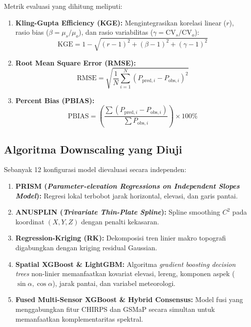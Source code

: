 \documentclass[11pt,a4paper,titlepage]{article}
\begin{document}
Metrik evaluasi yang dihitung meliputi:
\begin{enumerate}
    \item \textbf{Kling-Gupta Efficiency (KGE):} Mengintegrasikan korelasi linear ($r$), rasio bias ($\beta = \mu_s / \mu_o$), dan rasio variabilitas ($\gamma = \text{CV}_s / \text{CV}_o$):
    \begin{equation}
        \text{KGE} = 1 - \sqrt{(r - 1)^2 + (\beta - 1)^2 + (\gamma - 1)^2}
    \end{equation}
    \item \textbf{Root Mean Square Error (RMSE):}
    \begin{equation}
        \text{RMSE} = \sqrt{\frac{1}{N} \sum_{i=1}^{N} (P_{\text{pred}, i} - P_{\text{obs}, i})^2}
    \end{equation}
    \item \textbf{Percent Bias (PBIAS):}
    \begin{equation}
        \text{PBIAS} = \left( \frac{\sum (P_{\text{pred}, i} - P_{\text{obs}, i})}{\sum P_{\text{obs}, i}} \right) \times 100\%
    \end{equation}
\end{enumerate}

\subsection{Algoritma Downscaling yang Diuji}
Sebanyak 12 konfigurasi model dievaluasi secara independen:
\begin{enumerate}
    \item \textbf{PRISM (\textit{Parameter-elevation Regressions on Independent Slopes Model}):} Regresi lokal terbobot jarak horizontal, elevasi, dan garis pantai.
    \item \textbf{ANUSPLIN (\textit{Trivariate Thin-Plate Spline}):} Spline smoothing $C^2$ pada koordinat $(X, Y, Z)$ dengan penalti kekasaran.
    \item \textbf{Regression-Kriging (RK):} Dekomposisi tren linier makro topografi digabungkan dengan kriging residual Gaussian.
    \item \textbf{Spatial XGBoost \& LightGBM:} Algoritma \textit{gradient boosting decision trees} non-linier memanfaatkan kovariat elevasi, lereng, komponen aspek ($\sin \alpha, \cos \alpha$), jarak pantai, dan variabel meteorologi.
    \item \textbf{Fused Multi-Sensor XGBoost \& Hybrid Consensus:} Model fusi yang menggabungkan fitur CHIRPS dan GSMaP secara simultan untuk memanfaatkan komplementaritas spektral.
\end{enumerate}
\end{document}
